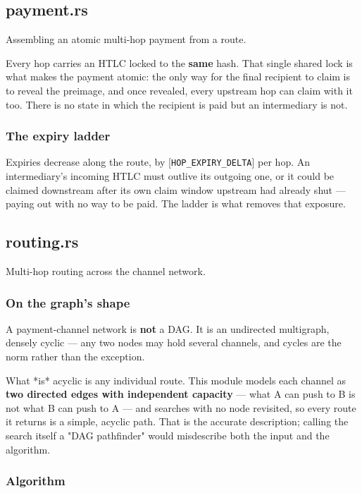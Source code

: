 \documentclass[11pt,a4paper]{article}
\begin{document}
\subsection{payment.rs}
Assembling an atomic multi-hop payment from a route.

Every hop carries an HTLC locked to the \textbf{same} hash. That single shared
lock is what makes the payment atomic: the only way for the final recipient
to claim is to reveal the preimage, and once revealed, every upstream hop can
claim with it too. There is no state in which the recipient is paid but an
intermediary is not.

\subsubsection{The expiry ladder}

Expiries decrease along the route, by [\texttt{HOP\_EXPIRY\_DELTA}] per hop. An
intermediary's incoming HTLC must outlive its outgoing one, or it could be
claimed downstream after its own claim window upstream had already shut —
paying out with no way to be paid. The ladder is what removes that exposure.

\subsection{routing.rs}
Multi-hop routing across the channel network.

\subsubsection{On the graph's shape}

A payment-channel network is \textbf{not} a DAG. It is an undirected multigraph,
densely cyclic — any two nodes may hold several channels, and cycles are the
norm rather than the exception.

What *is* acyclic is any individual route. This module models each channel as
\textbf{two directed edges with independent capacity} — what A can push to B is
not what B can push to A — and searches with no node revisited, so every
route it returns is a simple, acyclic path. That is the accurate description;
calling the search itself a "DAG pathfinder" would misdescribe both the input
and the algorithm.

\subsubsection{Algorithm}
\end{document}
